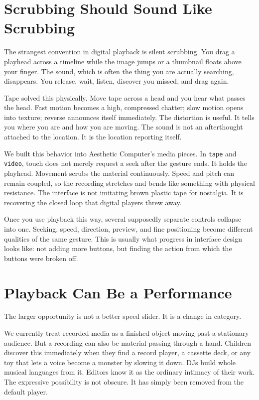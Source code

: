 \documentclass[11pt,letterpaper]{article}
\begin{document}
\section{Scrubbing Should Sound Like Scrubbing}

The strangest convention in digital playback is silent scrubbing. You drag a playhead across a timeline while the image jumps or a thumbnail floats above your finger. The sound, which is often the thing you are actually searching, disappears. You release, wait, listen, discover you missed, and drag again.

Tape solved this physically. Move tape across a head and you hear what passes the head. Fast motion becomes a high, compressed chatter; slow motion opens into texture; reverse announces itself immediately. The distortion is useful. It tells you where you are and how you are moving. The sound is not an afterthought attached to the location. It is the location reporting itself.

We built this behavior into Aesthetic Computer's media pieces. In \texttt{tape} and \texttt{video}, touch does not merely request a seek after the gesture ends. It holds the playhead. Movement scrubs the material continuously. Speed and pitch can remain coupled, so the recording stretches and bends like something with physical resistance. The interface is not imitating brown plastic tape for nostalgia. It is recovering the closed loop that digital players threw away.

Once you use playback this way, several supposedly separate controls collapse into one. Seeking, speed, direction, preview, and fine positioning become different qualities of the same gesture. This is usually what progress in interface design looks like: not adding more buttons, but finding the action from which the buttons were broken off.

\section{Playback Can Be a Performance}

The larger opportunity is not a better speed slider. It is a change in category.

We currently treat recorded media as a finished object moving past a stationary audience. But a recording can also be material passing through a hand. Children discover this immediately when they find a record player, a cassette deck, or any toy that lets a voice become a monster by slowing it down. DJs build whole musical languages from it. Editors know it as the ordinary intimacy of their work. The expressive possibility is not obscure. It has simply been removed from the default player.
\end{document}
